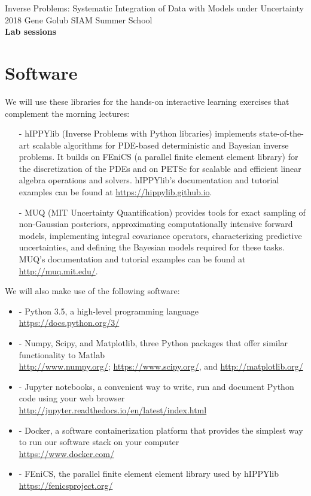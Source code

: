 \documentclass[11pt]{article}
\newcommand{\bit}{\begin{itemize}}
\newcommand{\eit}{\end{itemize}}
\newcommand{\zapspace}{\topsep=0pt\partopsep=0pt\itemsep=0pt\parskip=0pt}
\begin{document}
\pagestyle{empty}

\begin{center}
\large \textsf{%
Inverse Problems: Systematic Integration of Data with Models under Uncertainty\\
2018 Gene Golub SIAM Summer School\\[1mm]
\textbf{Lab sessions}}
\end{center}

\section{Software}

We will use these libraries for the hands-on interactive learning exercises that complement the morning lectures:

\begin{itemize}

\item[-] hIPPYlib (Inverse Problems with Python libraries) implements state-of-the-art scalable algorithms for PDE-based deterministic and Bayesian inverse problems. It builds on FEniCS (a parallel finite element element library) for the discretization of the PDEs and on PETSc for scalable and efficient linear algebra operations and solvers. hIPPYlib's documentation and tutorial examples can be found at \url{https://hippylib.github.io}.

\item[-] MUQ (MIT Uncertainty Quantification) provides tools for exact sampling of non-Gaussian posteriors, approximating computationally intensive forward models, implementing integral covariance operators, characterizing predictive uncertainties, and defining the Bayesian models required for these tasks. MUQ's documentation and tutorial examples can be found at \url{http://muq.mit.edu/}.

\end{itemize}

\noindent We will also make use of the following software:

\bit
\zapspace
\item[-] Python 3.5, a high-level programming language\\
\url{https://docs.python.org/3/}
\item[-] Numpy, Scipy, and Matplotlib, three Python packages that offer similar functionality to Matlab\\
\url{http://www.numpy.org/}; \url{https://www.scipy.org/}, and \url{http://matplotlib.org/}
\item[-] Jupyter notebooks, a convenient way to write, run and document Python code using your web browser\\
\url{http://jupyter.readthedocs.io/en/latest/index.html}
\item[-] Docker, a software containerization platform that provides the simplest way to run our software stack on your computer\\
\url{https://www.docker.com/}
\item[-] FEniCS, the parallel finite element element library used by hIPPYlib\\
\url{https://fenicsproject.org/}
\eit
\end{document}
